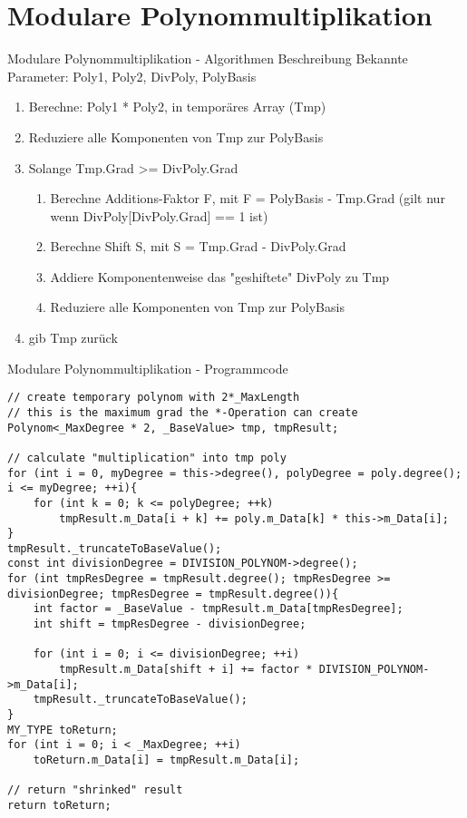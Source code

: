 \documentclass{beamer}
\begin{document}
  \section{Modulare Polynommultiplikation}
    \begin{frame}{Modulare Polynommultiplikation \newline - Algorithmen Beschreibung}
		Bekannte Parameter: Poly1, Poly2, DivPoly, PolyBasis
    	\begin{enumerate}
  	  	\item Berechne: Poly1 * Poly2, in temporäres Array (Tmp)
  	  	\item Reduziere alle Komponenten von Tmp zur PolyBasis
  	  	\item Solange Tmp.Grad >= DivPoly.Grad
  	  	\begin{enumerate}
	  	  	\item Berechne Additions-Faktor F, mit F = PolyBasis - Tmp.Grad \newline (gilt nur wenn DivPoly[DivPoly.Grad] == 1 ist)
	  	  	\item Berechne Shift S, mit S = Tmp.Grad - DivPoly.Grad
	  	  	\item Addiere Komponentenweise das "geshiftete" DivPoly zu Tmp
	  	  	\item Reduziere alle Komponenten von Tmp zur PolyBasis
  	  	\end{enumerate}
  	  	\item gib Tmp zurück
  	  	\end{enumerate}
    \end{frame}
    
    \begin{frame}[fragile]{Modulare Polynommultiplikation \newline - Programmcode}
    	\begin{lstlisting}[style=numbers]
// create temporary polynom with 2*_MaxLength
// this is the maximum grad the *-Operation can create
Polynom<_MaxDegree * 2, _BaseValue> tmp, tmpResult;

// calculate "multiplication" into tmp poly
for (int i = 0, myDegree = this->degree(), polyDegree = poly.degree(); i <= myDegree; ++i){
    for (int k = 0; k <= polyDegree; ++k)
        tmpResult.m_Data[i + k] += poly.m_Data[k] * this->m_Data[i];
}
tmpResult._truncateToBaseValue();
const int divisionDegree = DIVISION_POLYNOM->degree();
for (int tmpResDegree = tmpResult.degree(); tmpResDegree >= divisionDegree; tmpResDegree = tmpResult.degree()){
    int factor = _BaseValue - tmpResult.m_Data[tmpResDegree];
    int shift = tmpResDegree - divisionDegree;

    for (int i = 0; i <= divisionDegree; ++i)
        tmpResult.m_Data[shift + i] += factor * DIVISION_POLYNOM->m_Data[i];
    tmpResult._truncateToBaseValue();
}
MY_TYPE toReturn;
for (int i = 0; i < _MaxDegree; ++i)
    toReturn.m_Data[i] = tmpResult.m_Data[i];

// return "shrinked" result
return toReturn;
\end{lstlisting}
\end{frame}
\end{document}
